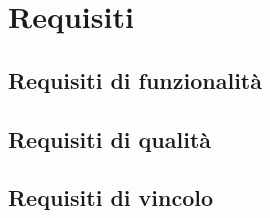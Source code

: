 \section{Requisiti}
\subsection{Requisiti di funzionalità}
\subsection{Requisiti di qualità}
\subsection{Requisiti di vincolo}